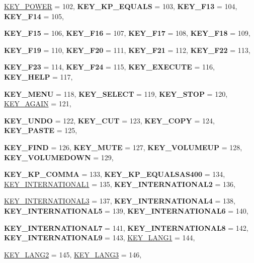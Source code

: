 \begin{DoxyCompactItemize}
\par
\hyperlink{classMezzanine_1_1MetaCode_a3b5633f0145bf3287cf53a3f05b5563cabd172c9969297155e90ffc5f59f2d44a}{KEY\_\-POWER} =  102, 
{\bfseries KEY\_\-KP\_\-EQUALS} =  103, 
{\bfseries KEY\_\-F13} =  104, 
{\bfseries KEY\_\-F14} =  105, 
\par
{\bfseries KEY\_\-F15} =  106, 
{\bfseries KEY\_\-F16} =  107, 
{\bfseries KEY\_\-F17} =  108, 
{\bfseries KEY\_\-F18} =  109, 
\par
{\bfseries KEY\_\-F19} =  110, 
{\bfseries KEY\_\-F20} =  111, 
{\bfseries KEY\_\-F21} =  112, 
{\bfseries KEY\_\-F22} =  113, 
\par
{\bfseries KEY\_\-F23} =  114, 
{\bfseries KEY\_\-F24} =  115, 
{\bfseries KEY\_\-EXECUTE} =  116, 
{\bfseries KEY\_\-HELP} =  117, 
\par
{\bfseries KEY\_\-MENU} =  118, 
{\bfseries KEY\_\-SELECT} =  119, 
{\bfseries KEY\_\-STOP} =  120, 
\hyperlink{classMezzanine_1_1MetaCode_a3b5633f0145bf3287cf53a3f05b5563ca47b284cca42343cfa4a022a696682900}{KEY\_\-AGAIN} =  121, 
\par
{\bfseries KEY\_\-UNDO} =  122, 
{\bfseries KEY\_\-CUT} =  123, 
{\bfseries KEY\_\-COPY} =  124, 
{\bfseries KEY\_\-PASTE} =  125, 
\par
{\bfseries KEY\_\-FIND} =  126, 
{\bfseries KEY\_\-MUTE} =  127, 
{\bfseries KEY\_\-VOLUMEUP} =  128, 
{\bfseries KEY\_\-VOLUMEDOWN} =  129, 
\par
{\bfseries KEY\_\-KP\_\-COMMA} =  133, 
{\bfseries KEY\_\-KP\_\-EQUALSAS400} =  134, 
\hyperlink{classMezzanine_1_1MetaCode_a3b5633f0145bf3287cf53a3f05b5563ca460281c06ac23cd946038278895f077f}{KEY\_\-INTERNATIONAL1} =  135, 
{\bfseries KEY\_\-INTERNATIONAL2} =  136, 
\par
\hyperlink{classMezzanine_1_1MetaCode_a3b5633f0145bf3287cf53a3f05b5563cac78818ced3df26bcfc297c36174551bc}{KEY\_\-INTERNATIONAL3} =  137, 
{\bfseries KEY\_\-INTERNATIONAL4} =  138, 
{\bfseries KEY\_\-INTERNATIONAL5} =  139, 
{\bfseries KEY\_\-INTERNATIONAL6} =  140, 
\par
{\bfseries KEY\_\-INTERNATIONAL7} =  141, 
{\bfseries KEY\_\-INTERNATIONAL8} =  142, 
{\bfseries KEY\_\-INTERNATIONAL9} =  143, 
\hyperlink{classMezzanine_1_1MetaCode_a3b5633f0145bf3287cf53a3f05b5563ca8ae55af750172568c66d8928d443c9a5}{KEY\_\-LANG1} =  144, 
\par
\hyperlink{classMezzanine_1_1MetaCode_a3b5633f0145bf3287cf53a3f05b5563ca56c52b32d2e23820f381c4a8e45407fe}{KEY\_\-LANG2} =  145, 
\hyperlink{classMezzanine_1_1MetaCode_a3b5633f0145bf3287cf53a3f05b5563cad5d372c19227a6b19ca1a2d86a4cdda6}{KEY\_\-LANG3} =  146, 

\end{DoxyCompactItemize}
